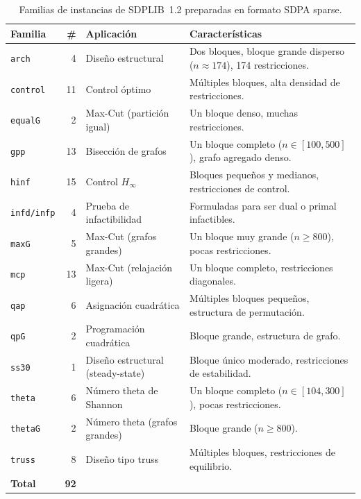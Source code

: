 \begin{table}[htbp]
\centering
\caption{Familias de instancias de SDPLIB~1.2 preparadas en formato SDPA sparse.}
\label{tab:instancias_sdplib}
\small
\begin{tabular}{lrp{3.2cm}p{5.8cm}}
\toprule
\textbf{Familia} & \textbf{\#} & \textbf{Aplicación} & \textbf{Características} \\
\midrule
\texttt{arch}      &  4 & Diseño estructural
    & Dos bloques, bloque grande disperso ($n\approx174$), 174 restricciones. \\
\texttt{control}   & 11 & Control óptimo
    & Múltiples bloques, alta densidad de restricciones. \\
\texttt{equalG}    &  2 & Max-Cut (partición igual)
    & Un bloque denso, muchas restricciones. \\
\texttt{gpp}       & 13 & Bisección de grafos
    & Un bloque completo ($n\in[100,500]$), grafo agregado denso. \\
\texttt{hinf}      & 15 & Control $H_\infty$
    & Bloques pequeños y medianos, restricciones de control. \\
\texttt{infd/infp} &  4 & Prueba de infactibilidad
    & Formuladas para ser dual o primal infactibles. \\
\texttt{maxG}      &  5 & Max-Cut (grafos grandes)
    & Un bloque muy grande ($n\geq800$), pocas restricciones. \\
\texttt{mcp}       & 13 & Max-Cut (relajación ligera)
    & Un bloque completo, restricciones diagonales. \\
\texttt{qap}       &  6 & Asignación cuadrática
    & Múltiples bloques pequeños, estructura de permutación. \\
\texttt{qpG}       &  2 & Programación cuadrática
    & Bloque grande, estructura de grafo. \\
\texttt{ss30}      &  1 & Diseño estructural (steady-state)
    & Bloque único moderado, restricciones de estabilidad. \\
\texttt{theta}     &  6 & Número theta de Shannon
    & Un bloque completo ($n\in[104,300]$), pocas restricciones. \\
\texttt{thetaG}    &  2 & Número theta (grafos grandes)
    & Bloque grande ($n\geq800$). \\
\texttt{truss}     &  8 & Diseño tipo truss
    & Múltiples bloques, restricciones de equilibrio. \\
\midrule
\textbf{Total}     & \textbf{92} & & \\
\bottomrule
\end{tabular}
\end{table}
